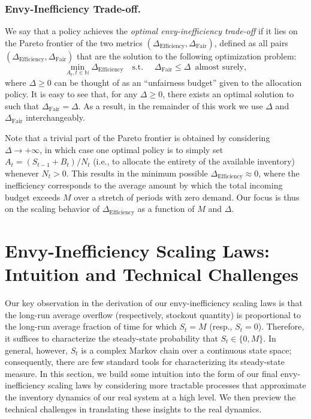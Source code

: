 \documentclass[mnsc,nonblindrev]{informs3}
\newcommand{\Deff}{\Delta_{\text{Efficiency}}\xspace}
\newcommand{\Dfair}{\Delta_{\text{Fair}}\xspace}
\renewcommand{\paragraph}[1]{\subsubsection*{#1}}
\begin{document}
\paragraph{Envy-Inefficiency Trade-off.}  We say that a policy achieves the \emph{optimal envy-inefficiency trade-off} if it lies on the Pareto frontier of the two metrics $(\Deff,\Dfair)$, 
defined as all pairs $(\Deff,\Dfair)$ that are the solution to the following optimization problem:
\begin{equation}
\label{eq:goal}
    \min_{A_t, t \in \mathbb{N}} \Deff \quad \text{s.t. } \quad \Dfair \leq \Delta \,\text{ almost surely},
\end{equation}
where $\Delta \geq 0$ can be thought of as an ``unfairness budget'' given to the allocation policy. It is easy to see that, for any $\Delta \geq 0$, there exists an optimal solution to  such that $\Dfair = \Delta$. As a result, in the remainder of this work we use $\Delta$ and $\Dfair$ interchangeably. 

Note that a trivial part of the Pareto frontier is obtained by considering $\Delta \rightarrow +\infty$, in which case one optimal policy is to simply set $A_t = (S_{t-1}+B_t) / N_t$ (i.e., to allocate the entirety of the available inventory) whenever $N_t>0$.
This results in the minimum possible $\Deff \approx 0$, where the inefficiency corresponds to the average amount by which the total incoming budget exceeds $M$ over a stretch of periods with zero demand. Our focus is thus on the scaling behavior of $\Deff$ as a function of $M$ and $\Delta$.
\section{Envy-Inefficiency Scaling Laws: Intuition and Technical Challenges}
\label{ssec:warmup}

Our key observation in the derivation of our envy-inefficiency scaling laws is that the long-run average overflow (respectively, stockout quantity) is proportional to the long-run average fraction of time for which $S_t = M$ (resp., $S_t = 0$). Therefore, it suffices to characterize the steady-state probability that $S_t \in \{0,M\}$. In general, however, $S_t$ is a complex Markov chain over a continuous state space; consequently, there are few standard tools for characterizing its steady-state measure. In this section, we build some intuition into the form of our final envy-inefficiency scaling laws by considering more tractable processes that approximate the inventory dynamics of our real system at a high level. We then preview the technical challenges in translating these insights to the real dynamics.
\end{document}
